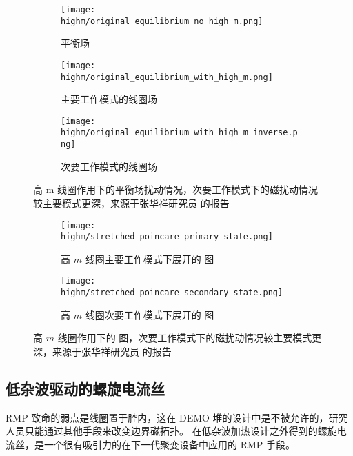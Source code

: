 \begin{figure}[htbp]
    \centering%
    \begin{subfigure}{0.33\textwidth}
      \texttt{[image: highm/original\_equilibrium\_no\_high\_m.png]}
      \caption{平衡场}
    \end{subfigure}%
    \begin{subfigure}{0.33\textwidth}
      \texttt{[image: highm/original\_equilibrium\_with\_high\_m.png]}
      \caption{主要工作模式的线圈场}
    \end{subfigure}
    \begin{subfigure}{0.33\textwidth}
      \texttt{[image: highm/original\_equilibrium\_with\_high\_m\_inverse.png]}
      \caption{次要工作模式的线圈场}
    \end{subfigure}
    \caption{高 m 线圈作用下的平衡场扰动情况，次要工作模式下的磁扰动情况较主要模式更深，来源于张华祥研究员 \cite{zhang_highm} 的报告}
    \label{fig:highm-three-subfig-poincare}
  \end{figure}

  
\begin{figure}[htbp]
    \centering%
    \begin{subfigure}{0.8\textwidth}
        \texttt{[image: highm/stretched\_poincare\_primary\_state.png]}
        \caption{高 $m$ 线圈主要工作模式下展开的 \Poincare 图}
    \end{subfigure}
    \begin{subfigure}{0.8\textwidth}
        \texttt{[image: highm/stretched\_poincare\_secondary\_state.png]}
        \caption{高 $m$ 线圈次要工作模式下展开的 \Poincare 图}
    \end{subfigure}
    \caption{高 $m$ 线圈作用下的 \Poincare 图，次要工作模式下的磁扰动情况较主要模式更深，来源于张华祥研究员 \cite{zhang_highm} 的报告}
    \label{fig:highm-stretched-poincare}
\end{figure}
  





\subsection{低杂波驱动的螺旋电流丝}
RMP 致命的弱点是线圈置于腔内，这在 DEMO 堆的设计中是不被允许的，研究人员只能通过其他手段来改变边界磁拓扑。 在低杂波加热设计之外得到的螺旋电流丝，是一个很有吸引力的在下一代聚变设备中应用的 RMP 手段。


